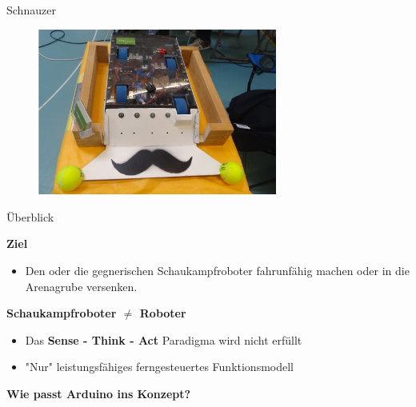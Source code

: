 \documentclass{beamer}
\begin{document}
\begin{frame}{Schnauzer}
 \begin{figure}[H]
  \centering
  \includegraphics[width=0.7\textwidth]{./images/robot-schnauzer.jpg}
 \end{figure}
\end{frame}
\begin{frame}{\"Uberblick}
\begin{large}\textbf{Ziel}\end{large}
\begin{itemize}
	\item Den oder die gegnerischen Schaukampfroboter fahrunf\"ahig machen oder in die Arenagrube versenken.
\end{itemize}
\vspace{20px}
\begin{large}\textbf{Schaukampfroboter $\neq$ Roboter}\end{large}
\begin{itemize}
	\item Das \textbf{Sense - Think - Act} Paradigma wird nicht erf\"ullt
	\item "Nur" leistungsf\"ahiges ferngesteuertes Funktionsmodell
\end{itemize}
\vspace{20px}
\begin{large}\textbf{Wie passt Arduino ins Konzept?}\end{large}
\end{frame}
\end{document}
